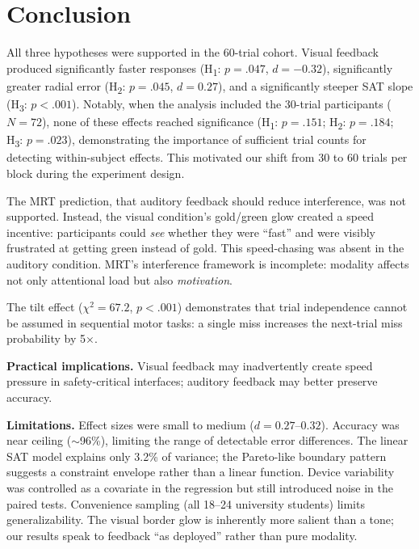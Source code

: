 \documentclass[12pt,letterpaper]{article}
\begin{document}
\section{Conclusion}

All three hypotheses were supported in the 60-trial cohort. Visual feedback produced significantly faster responses (H\textsubscript{1}: $p = .047$, $d = -0.32$), significantly greater radial error (H\textsubscript{2}: $p = .045$, $d = 0.27$), and a significantly steeper SAT slope (H\textsubscript{3}: $p < .001$). Notably, when the analysis included the 30-trial participants ($N = 72$), none of these effects reached significance (H\textsubscript{1}: $p = .151$; H\textsubscript{2}: $p = .184$; H\textsubscript{3}: $p = .023$), demonstrating the importance of sufficient trial counts for detecting within-subject effects. This motivated our shift from 30 to 60 trials per block during the experiment design.

The MRT prediction, that auditory feedback should reduce interference, was not supported. Instead, the visual condition's gold/green glow created a speed incentive: participants could \emph{see} whether they were ``fast'' and were visibly frustrated at getting green instead of gold. This speed-chasing was absent in the auditory condition. MRT's interference framework is incomplete: modality affects not only attentional load but also \emph{motivation}.

The tilt effect ($\chi^2 = 67.2$, $p < .001$) demonstrates that trial independence cannot be assumed in sequential motor tasks: a single miss increases the next-trial miss probability by 5$\times$.

\textbf{Practical implications.} Visual feedback may inadvertently create speed pressure in safety-critical interfaces; auditory feedback may better preserve accuracy.

\textbf{Limitations.} Effect sizes were small to medium ($d = 0.27$--$0.32$). Accuracy was near ceiling ($\sim$96\%), limiting the range of detectable error differences. The linear SAT model explains only 3.2\% of variance; the Pareto-like boundary pattern suggests a constraint envelope rather than a linear function. Device variability was controlled as a covariate in the regression but still introduced noise in the paired tests. Convenience sampling (all 18--24 university students) limits generalizability. The visual border glow is inherently more salient than a tone; our results speak to feedback ``as deployed'' rather than pure modality.
\end{document}
